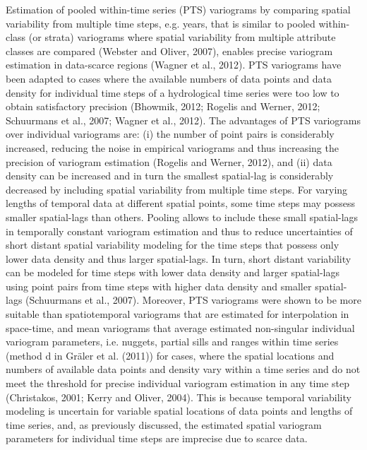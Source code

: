 Estimation of pooled within-time series (PTS) variograms by comparing spatial variability from multiple time steps, e.g. years, that is similar to pooled within-class (or strata) variograms where spatial variability from multiple attribute classes are compared (Webster and Oliver, 2007), enables precise variogram estimation in data-scarce regions (Wagner et al., 2012). PTS variograms have been adapted to cases where the available numbers of data points and data density for individual time steps of a hydrological time series were too low to obtain satisfactory precision (Bhowmik, 2012; Rogelis and Werner, 2012; Schuurmans et al., 2007; Wagner et al., 2012). The advantages of PTS variograms over individual variograms are: (i) the number of point pairs is considerably increased, reducing the noise in empirical variograms and thus increasing the precision of variogram estimation (Rogelis and Werner, 2012), and (ii) data density can be increased and in turn the smallest spatial-lag is considerably decreased by including spatial variability from multiple time steps. For varying lengths of temporal data at different spatial points, some time steps may possess smaller spatial-lags than others. Pooling allows to include these small spatial-lags in temporally constant variogram estimation and thus to reduce uncertainties of short distant spatial variability modeling for the time steps that possess only lower data density and thus larger spatial-lags. In turn, short distant variability can be modeled for time steps with lower data density and larger spatial-lags using point pairs from time steps with higher data density and smaller spatial-lags (Schuurmans et al., 2007). Moreover, PTS variograms were shown to be more suitable than spatiotemporal variograms that are estimated for interpolation in space-time, and mean variograms that average estimated non-singular individual variogram parameters, i.e. nuggets, partial sills and ranges within time series (method d in Gräler et al. (2011)) for cases, where the spatial locations and numbers of available data points and density vary within a time series and do not meet the threshold for precise individual variogram estimation in any time step (Christakos, 2001; Kerry and Oliver, 2004). This is because temporal variability modeling is uncertain for variable spatial locations of data points and lengths of time series, and, as previously discussed, the estimated spatial variogram parameters for individual time steps are imprecise due to scarce data.

